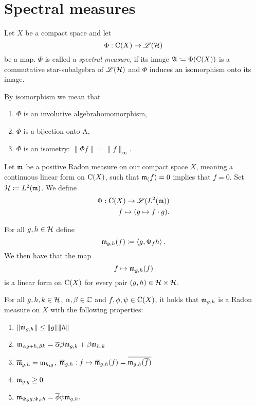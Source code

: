 
\section{Spectral measures}

\begin{defi}
 
 Let $X$ be a compact space and let
 \[
  \Phi : \operatorname{C} (X) \to \mathscr{L}(\mathcal{H})
 \]
be a map. $\Phi$ is called a \textit{spectral measure}, if its image 
$\mathfrak{A} \coloneqq \Phi(\operatorname{C} (X))$ is a commutative star-subalgebra of $\mathscr{L}(\mathcal{H})$ and 
$\Phi$ induces an isomorphism onto its image.
\end{defi}

\begin{rem}
 By isomorphism we mean that
 \begin{enumerate}
  \item $\Phi$ is an involutive algebrahomomorphism,
  \item $\Phi$ is a bijection onto A,
  \item $\Phi$ is an isometry: $\| \Phi f \| = \| f \|_\infty$.
 \end{enumerate}

\end{rem}


Let $\mathfrak{m}_{}$ be a positive Radon measure on our compact space $X$, meaning a
continuous linear form on $\operatorname{C} (X)$, such that $\mathfrak{m}_{(}f) = 0$ implies that $f=0$. Set $\mathcal{H} \coloneqq L^2(\mathfrak{m})$.
We define 
\begin{align*}
 \Phi : \operatorname{C}(X) \to \mathscr{L}({L^2(\mathfrak{m})}) \\
 f \mapsto (g \mapsto f\cdot g).
\end{align*}

For all $g , h \in \mathcal{H}$ define
\[
 \mathfrak{m}_{g, h} (f) \coloneqq \left\langle g, \Phi_f h \right\rangle.
\]
We then have that the map 
\[
 f \mapsto \mathfrak{m}_{g,h} (f)
\]
is a linear form on $\operatorname{C} (X)$ for every pair $(g, h) \in \mathcal{H} \times \mathcal{H}$.

\begin{thrm}
For all $g, h,k \in \mathcal{H}$, $\alpha, \beta \in \mathbb{C}$ and $f, \phi, \psi \in 
\operatorname{C}(X)$, it holds that $\mathfrak{m}_{g,h}$ is a Radon measure on $X$ with the following 
properties:
\begin{enumerate}[{(}i{)}]
 \item $\| \mathfrak{m}_{g,h}\| \leq \|g\| \|h\|$
 \item $\mathfrak{m}_{\alpha g + h, \beta k} = \overline{\alpha}\beta \mathfrak{m}_{g,k} + 
 \beta \mathfrak{m}_{h,k}$
 \item $\overline{\mathfrak{m}}_{g,h} = \mathfrak{m}_{h,g}$, $\overline{\mathfrak{m}}_{g,h} : 
 f \mapsto \overline{\mathfrak{m}}_{g,h}(f) = \overline{\mathfrak{m}_{g,h}(\overline{f})}$
 \item $\mathfrak{m}_{g,g} \geq 0$
 \item $\mathfrak{m}_{\Phi_\phi g, \Phi_\psi h} = \overline{\phi} \psi \mathfrak{m}_{g,h}.$
\end{enumerate}

\end{thrm}

